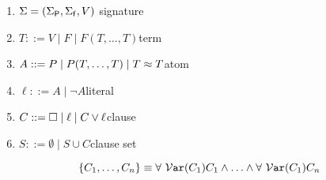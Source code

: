 \documentclass[ 
xcolor={usenames,dvipsnames,svgnames,tablem} 
,handout
]{beamer}
\begin{document}
\begin{frame}

\begin{notation}
\begin{enumerate}
\item $\Sigma = (\Sigma_{\mathsf P}, \Sigma_{\mathsf f}, V )$ \hfill signature
\item $T ::= V \mid F \mid F ( T,\ldots,T)$\hfill term
\item $A ::= P \mid P ( T, \ldots, T ) \mid T \approx T$\hfill  atom
%	
\item $\ell ::= A \mid \lnot A$\hfill literal
\item $C ::= \square \mid \ell \mid C \lor \ell$\hfill clause
\item $S ::= \emptyset \mid S \cup C$\hfill clause set
\end{enumerate}
\[
\{ C_1, \ldots, C_n \} \equiv 
\forall\ {\mathcal V}\mathtt{ar}(C_1) C_1 
\land \ldots \land
\forall\ {\mathcal V}\mathtt{ar}(C_1) C_n 
\]



\end{notation}

\end{frame}
\end{document}
